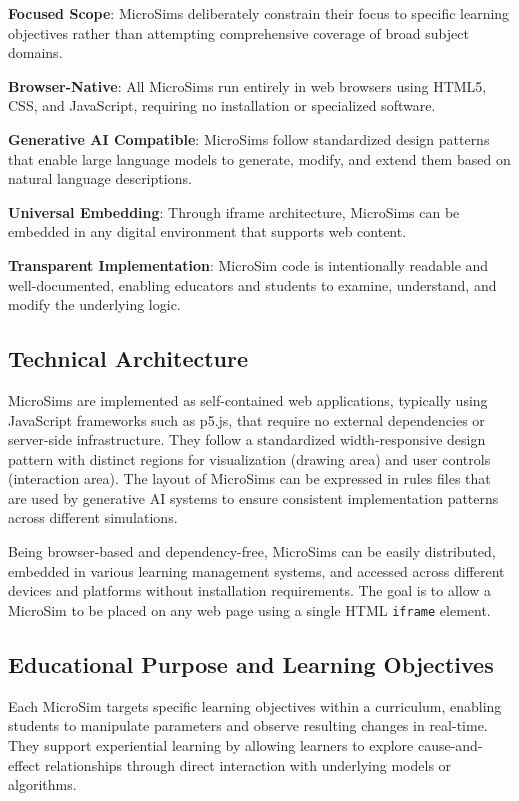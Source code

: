 \textbf{Focused Scope}: MicroSims deliberately constrain their focus to specific learning objectives rather than attempting comprehensive coverage of broad subject domains.

\textbf{Browser-Native}: All MicroSims run entirely in web browsers using HTML5, CSS, and JavaScript, requiring no installation or specialized software.

\textbf{Generative AI Compatible}: MicroSims follow standardized design patterns that enable large language models to generate, modify, and extend them based on natural language descriptions.

\textbf{Universal Embedding}: Through iframe architecture, MicroSims can be embedded in any digital environment that supports web content.

\textbf{Transparent Implementation}: MicroSim code is intentionally readable and well-documented, enabling educators and students to examine, understand, and modify the underlying logic.

\subsection{Technical Architecture}

MicroSims are implemented as self-contained web applications, typically using JavaScript frameworks such as p5.js, that require no external dependencies or server-side infrastructure. They follow a standardized width-responsive design pattern with distinct regions for visualization (drawing area) and user controls (interaction area). The layout of MicroSims can be expressed in rules files that are used by generative AI systems to ensure consistent implementation patterns across different simulations.

Being browser-based and dependency-free, MicroSims can be easily distributed, embedded in various learning management systems, and accessed across different devices and platforms without installation requirements. The goal is to allow a MicroSim to be placed on any web page using a single HTML \texttt{iframe} element.

\subsection{Educational Purpose and Learning Objectives}

Each MicroSim targets specific learning objectives within a curriculum, enabling students to manipulate parameters and observe resulting changes in real-time. They support experiential learning by allowing learners to explore cause-and-effect relationships through direct interaction with underlying models or algorithms.

